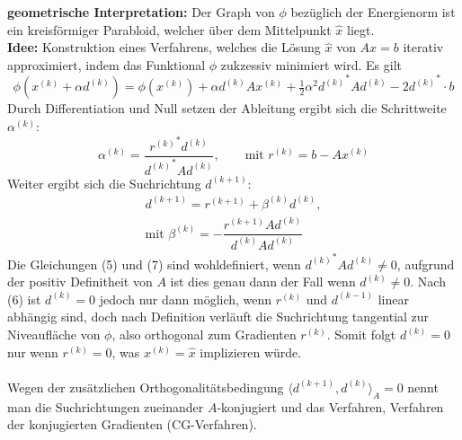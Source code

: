\documentclass{article}
\begin{document}
\textbf{geometrische Interpretation:} Der Graph von $\phi$ bezüglich der Energienorm ist ein kreisförmiger Parabloid, welcher über dem Mittelpunkt $\hat{x}$ liegt. \\
\textbf{Idee:} Konstruktion eines Verfahrens, welches die Lösung $\hat{x}$ von $Ax=b$ iterativ approximiert, indem das Funktional $\phi$ zukzessiv minimiert wird. Es gilt
\[\phi(x^{(k)}+\alpha d^{(k)}) = \phi(x^{(k)}) + \alpha d^{(k)}A x^{(k)} + \tfrac{1}{2}\alpha^2 {d^{(k)}}^*Ad^{(k)}-2{d^{(k)}}^*\cdot b \tag{4}\]
Durch Differentiation und Null setzen der Ableitung ergibt sich die Schrittweite $\alpha^{(k)}$:
\[\alpha^{(k)}=\dfrac{{r^{(k)}}^* d^{(k)}}{{d^{(k)}}^* A d^{(k)}},\qquad \text{mit } r^{(k)}=b-Ax^{(k)} \tag{5}\]
Weiter ergibt sich die Suchrichtung $d^{(k+1)}$:
\begin{align*}
    d^{(k+1)}=r^{(k+1)} + \beta^{(k)}d^{(k)},\tag{6}\\
    \text{mit } \beta^{(k)} = -\dfrac{r^{(k+1)}Ad^{(k)}}{d^{(k)}Ad^{(k)}} \tag{7}
\end{align*}
Die Gleichungen (5) und (7) sind wohldefiniert, wenn ${d^{(k)}}^*Ad^{(k)}\neq 0$, aufgrund der positiv Definitheit von $A$ ist dies genau dann der Fall wenn $d^{(k)}\neq 0$. 
Nach (6) ist $d^{(k)} = 0$ jedoch nur dann möglich, wenn $r^(k)$ und $d^{(k-1)}$ linear abhängig sind, doch nach Definition verläuft die Suchrichtung tangential zur Niveaufläche von $\phi$, also orthogonal zum Gradienten $r^{(k)}$.
Somit folgt $d^{(k)} = 0$ nur wenn $r^{(k)}=0$, was $x^{(k)}=\hat{x}$ implizieren würde. \\ \\
Wegen der zusätzlichen Orthogonalitätsbedingung $\langle d^{(k+1)},d^{(k)}\rangle_A=0$ nennt man die Suchrichtungen zueinander $A$-konjugiert und das Verfahren, Verfahren der konjugierten Gradienten (CG-Verfahren). 
\end{document}
